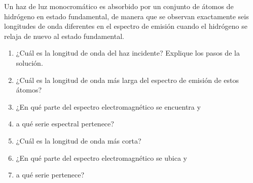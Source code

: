 \item Un haz de luz monocromático es absorbido por un conjunto de átomos de hidrógeno en estado fundamental, de manera que se observan exactamente seis longitudes de onda diferentes en el espectro de emisión cuando el hidrógeno se relaja de nuevo al estado fundamental.
\begin{enumerate}
    \item ¿Cuál es la longitud de onda del haz incidente? Explique los pasos de la solución.
    \item ¿Cuál es la longitud de onda más larga del espectro de emisión de estos átomos?
    \item ¿En qué parte del espectro electromagnético se encuentra y
    \item a qué serie espectral pertenece?
    \item ¿Cuál es la longitud de onda más corta?
    \item ¿En qué parte del espectro electromagnético se ubica y
    \item a qué serie pertenece?
\end{enumerate}